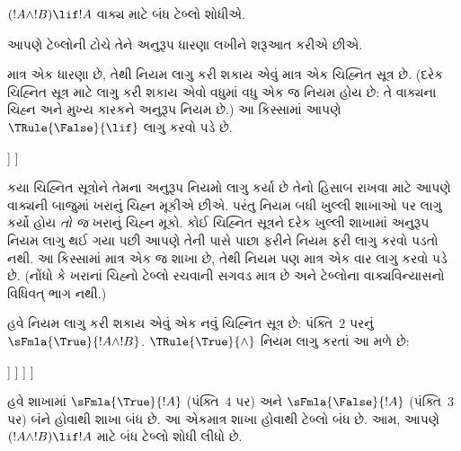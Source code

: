 \begingroup
\makeatletter{}\makeatother


\label{guunit:OLP-0103}


\begin{ex}
$(!A \land !B) \lif !A$ વાક્ય માટે બંધ ટેબ્લો શોધીએ.

આપણે ટેબ્લોની ટોચે તેને અનુરૂપ ધારણા લખીને શરૂઆત કરીએ છીએ.
\begin{oltableau}
  [\sFmla{\False}{(\formula{A} \land \formula{B}) \lif \formula{A}},
    just = \TAss]
\end{oltableau}

માત્ર એક ધારણા છે, તેથી નિયમ લાગુ કરી શકાય એવું માત્ર એક
ચિહ્નિત સૂત્ર છે. (દરેક ચિહ્નિત સૂત્ર માટે લાગુ કરી શકાય એવો
વધુમાં વધુ એક જ નિયમ હોય છે: તે વાક્યના ચિહ્ન અને
મુખ્ય કારકને અનુરૂપ નિયમ છે.) આ કિસ્સામાં આપણે
$\TRule{\False}{\lif}$ લાગુ કરવો પડે છે.
\begin{oltableau}
  [\sFmla{\False}{(\formula{A} \land \formula{B}) \lif \formula{A}},
    checked, just = \TAss
    [\sFmla{\True}{\formula{A} \land \formula{B}},
      just={\TRule{\False}{\lif}[1]}
      [\sFmla{\False}{\formula{A}}, just={\TRule{\False}{\lif}[1]}]
    ]
  ]
\end{oltableau}
કયા ચિહ્નિત સૂત્રોને તેમના અનુરૂપ નિયમો લાગુ કર્યા છે તેનો હિસાબ
રાખવા માટે આપણે વાક્યની બાજુમાં ખરાનું ચિહ્ન મૂકીએ છીએ. પરંતુ નિયમ
બધી ખુલ્લી શાખાઓ પર લાગુ કર્યો હોય \emph{તો જ} ખરાનું ચિહ્ન મૂકો. કોઈ
ચિહ્નિત સૂત્રને દરેક ખુલ્લી શાખામાં અનુરૂપ નિયમ લાગુ થઈ ગયા પછી
આપણે તેની પાસે પાછા ફરીને નિયમ ફરી લાગુ કરવો પડતો નથી. આ કિસ્સામાં
માત્ર એક જ શાખા છે, તેથી નિયમ પણ માત્ર એક વાર લાગુ કરવો પડે છે. (નોંધો
કે ખરાનાં ચિહ્નો ટેબ્લો રચવાની સગવડ માત્ર છે અને ટેબ્લોના વાક્યવિન્યાસનો
વિધિવત્ ભાગ નથી.)

હવે નિયમ લાગુ કરી શકાય એવું એક નવું ચિહ્નિત સૂત્ર છે: પંક્તિ~$2$
પરનું $\sFmla{\True}{!A \land !B}$. $\TRule{\True}{\land}$ નિયમ લાગુ
કરતાં આ મળે છે:
\begin{oltableau}
  [\sFmla{\False}{(\formula{A} \land \formula{B}) \lif \formula{A}},
    checked, just = \TAss
    [\sFmla{\True}{\formula{A} \land \formula{B}},
      just={\TRule{\False}{\lif}[1]}, checked
      [\sFmla{\False}{\formula{A}}, just={\TRule{\False}{\lif}[1]}
        [\sFmla{\True}{\formula{A}}, just={\TRule{\True}{\land}[2]}
          [\sFmla{\True}{\formula{B}}, just={\TRule{\True}{\land}[2]}, close
          ]
        ]
      ]
    ]
  ]
\end{oltableau}
હવે શાખામાં $\sFmla{\True}{!A}$ (પંક્તિ~$4$ પર) અને
$\sFmla{\False}{!A}$ (પંક્તિ~$3$ પર) બંને હોવાથી શાખા બંધ છે. આ એકમાત્ર
શાખા હોવાથી ટેબ્લો બંધ છે. આમ, આપણે~$(!A \land !B) \lif !A$ માટે
બંધ ટેબ્લો શોધી લીધો છે.
\end{ex}

